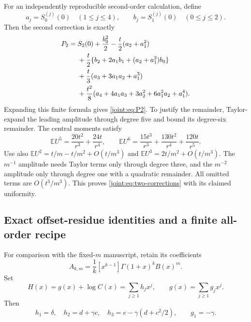 \documentclass[11pt,a4paper]{article}
\numberwithin{equation}{section}
\theoremstyle{plain}
\theoremstyle{definition}
\theoremstyle{remark}
\begin{document}
For an independently reproducible second-order calculation, define
\[
 a_j=S_0^{(j)}(0)\quad(1\leq j\leq4),\qquad
 b_j=S_1^{(j)}(0)\quad(0\leq j\leq2).
\]
Then the second correction is exactly
\begin{align}
 P_2={}&S_2(0)+\frac{b_0^2}{2}
       -\frac t2(a_2+a_1^2)\notag\\
 &+\frac t2\{b_2+2a_1b_1+(a_2+a_1^2)b_0\}\notag\\
 &+\frac t3(a_3+3a_1a_2+a_1^3)\notag\\
 &+\frac{t^2}{8}
     (a_4+4a_1a_3+3a_2^2+6a_1^2a_2+a_1^4).
 \label{joint:eq:P2-derivative}
\end{align}
Expanding this finite formula gives \eqref{joint:eq:P2}.
To justify the remainder, Taylor-expand the leading amplitude through
degree five and bound its degree-six remainder. The central moments
satisfy
\[
 \mathbb EU^5=\frac{20t^2}{r^3}+\frac{24t}{r^4},\qquad
 \mathbb EU^6=\frac{15t^3}{r^3}+\frac{130t^2}{r^4}
                                  +\frac{120t}{r^5}.
\]
Use also
$\mathbb EU^2=t/m-t/m^2+O(t/m^3)$ and
$\mathbb EU^3=2t/m^2+O(t/m^3)$.
The $m^{-1}$ amplitude needs Taylor terms only through degree three,
and the $m^{-2}$ amplitude only through degree one with a quadratic
remainder. All omitted terms are $O(t^3/m^3)$.
This proves \eqref{joint:eq:two-corrections} with its claimed uniformity.

\subsection{Exact offset-residue identities and a finite all-order recipe}

For comparison with the fixed-$m$ manuscript, retain its coefficients
\[
 A_{k,m}=\frac1k[x^{k-1}]\Gamma(1+x)^kB(x)^m.
\]
Set
\[
 H(x)=g(x)+\log C(x)=\sum_{j\geq1}h_jx^j,
 \qquad g(x)=\sum_{j\geq1}g_jx^j.
\]
Then
\[
 h_1=\delta,\quad h_2=d+\gamma c,\quad
 h_3=e-\gamma(d+c^2/2),\qquad g_1=-\gamma.
\]
\end{document}
